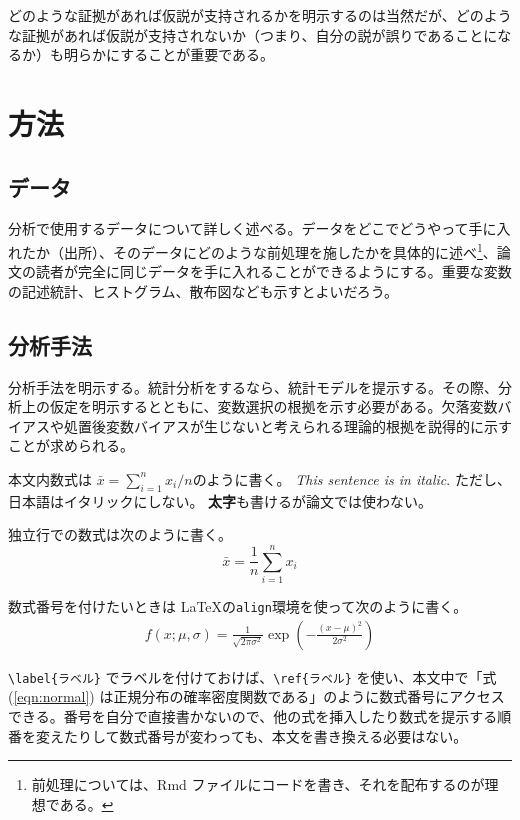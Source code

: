 \documentclass[lualatex,
               a4paper,
               10.5pt,
               ja=standard,
               jafont=ipaex]{bxjsarticle}
\begin{document}
どのような証拠があれば仮説が支持されるかを明示するのは当然だが、どのような証拠があれば仮説が支持されないか（つまり、自分の説が誤りであることになるか）も明らかにすることが重要である。

\section{方法}\label{ux65b9ux6cd5}

\subsection{データ}\label{ux30c7ux30fcux30bf}

分析で使用するデータについて詳しく述べる。データをどこでどうやって手に入れたか（出所）、そのデータにどのような前処理を施したかを具体的に述べ\footnote{前処理については、Rmd ファイルにコードを書き、それを配布するのが理想である。}、論文の読者が完全に同じデータを手に入れることができるようにする。重要な変数の記述統計、ヒストグラム、散布図なども示すとよいだろう。

\subsection{分析手法}\label{ux5206ux6790ux624bux6cd5}

分析手法を明示する。統計分析をするなら、統計モデルを提示する。その際、分析上の仮定を明示するとともに、変数選択の根拠を示す必要がある。欠落変数バイアスや処置後変数バイアスが生じないと考えられる理論的根拠を説得的に示すことが求められる。

本文内数式は \(\bar{x} = \sum_{i=1}^n x_i / n\)のように書く。 \emph{This sentence is in italic}. ただし、日本語はイタリックにしない。 \textbf{太字}も書けるが論文では使わない。

独立行での数式は次のように書く。
\[
\bar{x} = \frac{1}{n} \sum_{i=1}^n x_i
\]

数式番号を付けたいときは \LaTeX  の\texttt{align}環境を使って次のように書く。
\begin{align}
f(x ; \mu, \sigma) = \frac{1}{\sqrt{2\pi \sigma^2}}
  \exp \left( -\frac{(x - \mu)^2}{2 \sigma^2} \right)
  \label{eqn:normal}
\end{align}

\texttt{\textbackslash{}label\{ラベル\}} でラベルを付けておけば、\texttt{\textbackslash{}ref\{ラベル\}} を使い、本文中で「式 (\ref{eqn:normal}) は正規分布の確率密度関数である」のように数式番号にアクセスできる。番号を自分で直接書かないので、他の式を挿入したり数式を提示する順番を変えたりして数式番号が変わっても、本文を書き換える必要はない。
\end{document}
